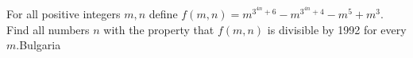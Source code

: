 For all positive integers $m,n$ define $f(m,n) = m^{3^{4n}+6} - m^{3^{4n}+4} - m^5 + m^3$. Find all numbers $n$ with the property that $f(m, n)$ is divisible by 1992 for every $m$.Bulgaria